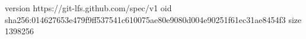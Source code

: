 version https://git-lfs.github.com/spec/v1
oid sha256:014627653e479f9ff537541c610075ae80e9080d004e90251f61ec31ae8454f3
size 1398256
